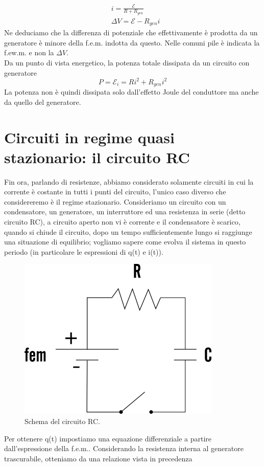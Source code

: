 \documentclass[10pt,a4paper]{article}
\begin{document}
\begin{align*}
	&i = \frac{\mathcal{E}}{R+R_{gen}}\\
	&\Delta V = \mathcal{E}-R_{gen}i
\end{align*}
Ne deduciamo che la differenza di potenziale che effettivamente è prodotta da un generatore è minore della f.e.m. indotta da questo. Nelle comuni pile è indicata la f.ew.m. e non la $\Delta V$.\\
Da un punto di vista energetico, la potenza totale dissipata da un circuito con generatore
\[P = \mathcal{E}_i = R i^2 + R_{gen}i^2\]
La potenza non è quindi dissipata solo dall'effetto Joule del conduttore ma anche da quello del generatore. 
\section{Circuiti in regime quasi stazionario: il circuito RC}
Fin ora, parlando di resistenze, abbiamo considerato solamente circuiti in cui la corrente è costante in tutti i punti del circuito, l'unico caso diverso che considereremo è il regime stazionario. Consideriamo un circuito con un condensatore, un generatore, un interruttore ed una resistenza in serie (detto circuito RC), a circuito aperto non vi è corrente e il condensatore è scarico, quando si chiude il circuito, dopo un tempo sufficientemente lungo si raggiunge una situazione di equilibrio; vogliamo sapere come evolva il sistema in questo periodo (in particolare le espressioni di q(t) e i(t)). 
\begin{figure}[h!]
	\centering
	\includegraphics[width=0.6\linewidth]{images/circuito-rc}
	\caption{Schema del circuito RC.}
	\label{fig:circuito-rc}
\end{figure}
\FloatBarrier
Per ottenere q(t) impostiamo una equazione differenziale a partire dall'espressione della f.e.m.. Considerando la resistenza interna al generatore trascurabile, otteniamo da una relazione vista in precedenza 
\end{document}
